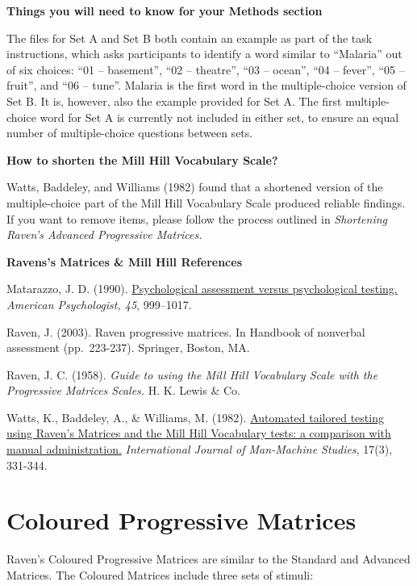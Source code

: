 \documentclass[
]{book}
\begin{document}
\textbf{Things you will need to know for your Methods section}

The files for Set A and Set B both contain an example as part of the task instructions, which asks participants to identify a word similar to ``Malaria'' out of six choices: ``01 -- basement'', ``02 -- theatre'', ``03 -- ocean'', ``04 -- fever'', ``05 -- fruit'', and ``06 -- tune''. Malaria is the first word in the multiple-choice version of Set B. It is, however, also the example provided for Set A. The first multiple-choice word for Set A is currently not included in either set, to ensure an equal number of multiple-choice questions between sets.

\textbf{How to shorten the Mill Hill Vocabulary Scale?}

Watts, Baddeley, and Williams (1982) found that a shortened version of the multiple-choice part of the Mill Hill Vocabulary Scale produced reliable findings. If you want to remove items, please follow the process outlined in \emph{Shortening Raven's Advanced Progressive Matrices.}

\textbf{Ravens's Matrices \& Mill Hill References}

Matarazzo, J. D. (1990). \href{https://www.gwern.net/docs/psychology/1990-matarazzo.pdf}{Psychological assessment versus psychological testing.} \emph{American Psychologist, 45}, 999--1017.

Raven, J. (2003). Raven progressive matrices. In Handbook of nonverbal assessment (pp.~223-237). Springer, Boston, MA.

Raven, J. C. (1958). \emph{Guide to using the Mill Hill Vocabulary Scale with the Progressive Matrices Scales.} H. K. Lewis \& Co.

Watts, K., Baddeley, A., \& Williams, M. (1982). \href{https://www.sciencedirect.com/science/article/abs/pii/S0020737382800357}{Automated tailored testing using Raven's Matrices and the Mill Hill Vocabulary tests: a comparison with manual administration.} \emph{International Journal of Man-Machine Studies}, 17(3), 331-344.

\hypertarget{coloured-progressive-matrices}{%
\section{Coloured Progressive Matrices}\label{coloured-progressive-matrices}}

Raven's Coloured Progressive Matrices are similar to the Standard and Advanced Matrices. The Coloured Matrices include three sets of stimuli:
\end{document}
